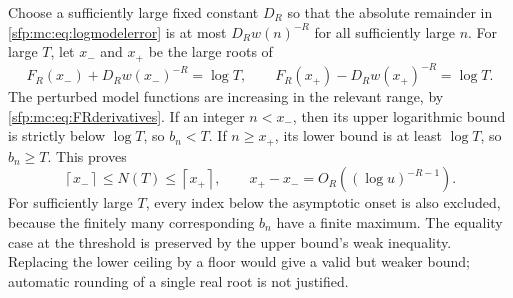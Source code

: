 \documentclass[11pt,letterpaper]{article}
\numberwithin{equation}{section}
\theoremstyle{definition}\newtheorem{definition}[theorem]{Definition}
\theoremstyle{remark}\newtheorem{remark}[theorem]{Remark}
\newcommand{\ceil}[1]{\left\lceil #1\right\rceil}
\begin{document}
Choose a sufficiently large fixed constant $D_R$ so that the
absolute remainder in \eqref{sfp:mc:eq:logmodelerror} is at most
$D_Rw(n)^{-R}$ for all sufficiently large $n$. For large $T$,
let $x_-$ and $x_+$ be the large roots of
\begin{equation}\label{sfp:mc:eq:modelroots}
 F_R(x_-)+D_Rw(x_-)^{-R}=\log T,\qquad
 F_R(x_+)-D_Rw(x_+)^{-R}=\log T.
\end{equation}
The perturbed model functions are increasing in the relevant
range, by \eqref{sfp:mc:eq:FRderivatives}. If an integer $n<x_-$,
then its upper logarithmic bound is strictly below $\log T$,
so $b_n<T$. If $n\geq x_+$, its lower bound is at least
$\log T$, so $b_n\geq T$. This proves
\begin{equation}\label{sfp:mc:eq:implicitbracket}
 \ceil{x_-}\leq N(T)\leq\ceil{x_+},\qquad
 x_+-x_-=O_R((\log u)^{-R-1}).
\end{equation}
For sufficiently large $T$, every index below the asymptotic onset
is also excluded, because the finitely many corresponding $b_n$
have a finite maximum. The equality case at the threshold is
preserved by the upper bound's weak inequality. Replacing the lower
ceiling by a floor would give a valid but weaker bound; automatic
rounding of a single real root is not justified.
\end{document}
